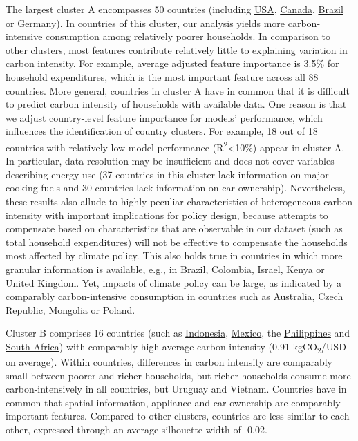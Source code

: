 \documentclass[12pt, a4paper]{article}
\begin{document}
The largest cluster A encompasses 50 countries (including \hyperref[fig:5b_USA]{USA}, \hyperref[fig:5b_CAN]{Canada}, \hyperref[fig:5b_BRA]{Brazil} or \hyperref[fig:5b_DEU]{Germany}). In countries of this cluster, our analysis yields more carbon-intensive consumption among relatively poorer households. In comparison to other clusters, most features contribute relatively little to explaining variation in carbon intensity. For example, average adjusted feature importance is 3.5\% for household expenditures, which is the most important feature across all 88 countries. More general, countries in cluster A have in common that it is difficult to predict carbon intensity of households with available data. One reason is that we adjust country-level feature importance for models' performance, which influences the identification of country clusters. For example, 18 out of 18 countries with relatively low model performance (R\textsuperscript{2}\textless 10\%) appear in cluster A. In particular, data resolution may be insufficient and does not cover variables describing energy use (37 countries in this cluster lack information on major cooking fuels and 30 countries lack information on car ownership). Nevertheless, these results also allude to highly peculiar characteristics of heterogeneous carbon intensity with important implications for policy design, because attempts to compensate based on characteristics that are observable in our dataset (such as total household expenditures) will not be effective to compensate the households most affected by climate policy. This also holds true in countries in which more granular information is available, e.g., in Brazil, Colombia, Israel, Kenya or United Kingdom. Yet, impacts of climate policy can be large, as indicated by a comparably carbon-intensive consumption in countries such as Australia, Czech Republic, Mongolia or Poland. 

Cluster B comprises 16 countries (such as \hyperref[fig:5b_IDN]{Indonesia}, \hyperref[fig:5b_MEX]{Mexico}, the \hyperref[fig:5b_PHL]{Philippines} and \hyperref[fig:5b_ZAF]{South Africa}) with comparably high average carbon intensity (0.91 kgCO\textsubscript{2}/USD on average). Within countries, differences in carbon intensity are comparably small between poorer and richer households, but richer households consume more carbon-intensively in all countries, but Uruguay and Vietnam. Countries have in common that spatial information, appliance and car ownership are comparably important features. Compared to other clusters, countries are less similar to each other, expressed through an average silhouette width of -0.02. 
\end{document}
